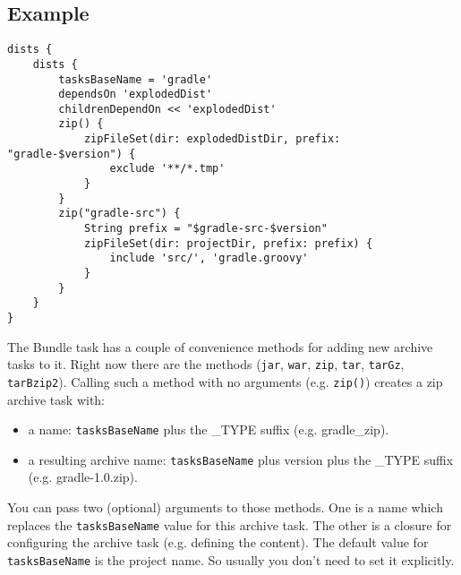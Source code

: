 \subsection{Example} %
\label{sub:example}
\begin{Verbatim}
dists {
	dists {
	    tasksBaseName = 'gradle'
	    dependsOn 'explodedDist'
	    childrenDependOn << 'explodedDist'
	    zip() {
	        zipFileSet(dir: explodedDistDir, prefix: "gradle-$version") {
	            exclude '**/*.tmp'
	        }
	    }
	    zip("gradle-src") {
	        String prefix = "$gradle-src-$version"
	        zipFileSet(dir: projectDir, prefix: prefix) {
	            include 'src/', 'gradle.groovy'
	        }
	    }
	}
}	
\end{Verbatim}
The Bundle task has a couple of convenience methods for adding new archive tasks to it. Right now there are the methods (\texttt{jar}, \texttt{war}, \texttt{zip}, \texttt{tar}, \texttt{tarGz}, \texttt{tarBzip2}). Calling such a method with no arguments (e.g. \texttt{zip()}) creates a zip archive task with:
\begin{itemize}
	\item a name: \texttt{tasksBaseName} plus the \_TYPE suffix (e.g. gradle\_zip).
	\item a resulting archive name: \texttt{tasksBaseName} plus version plus the \_TYPE suffix (e.g. gradle-1.0.zip).
\end{itemize}
You can pass two (optional) arguments to those methods. One is a name which replaces the \texttt{tasksBaseName} value for this archive task. The other is a closure for configuring the archive task (e.g. defining the content).
The default value for \texttt{tasksBaseName} is the project name. So usually you don't need to set it explicitly. 

